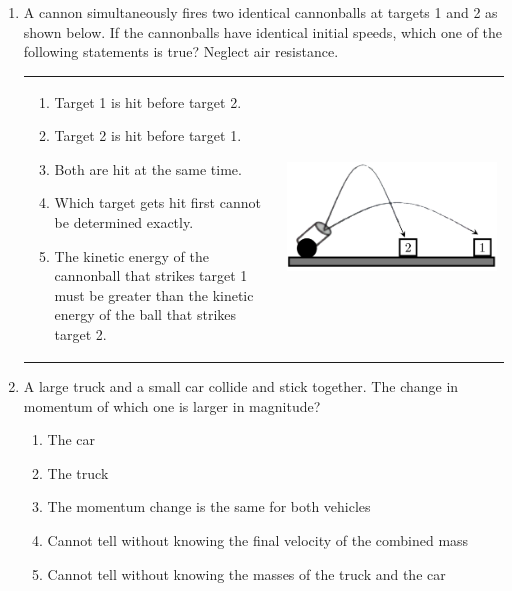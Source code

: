 \documentclass[12pt,letterpaper]{article}
\begin{document}
\begin{enumerate}

\item
A cannon simultaneously fires two identical cannonballs at targets 1 and 2 as shown below. If the cannonballs have identical initial speeds, which one of the following statements is true? Neglect air resistance.

\begin{tabular}{l r}

\begin{minipage}{0.5\textwidth}
\begin{enumerate}
\item Target 1 is hit before target 2.
\item Target 2 is hit before target 1.
\item Both are hit at the same time.
\item Which target gets hit first cannot be determined exactly.
\item The kinetic energy of the cannonball that strikes target 1 must be greater than the kinetic energy of the ball that strikes target 2.
\end{enumerate}
\end{minipage} &
\begin{minipage}{0.4\textwidth}
\includegraphics[width=\textwidth]{cannon.png}
\end{minipage}
\end{tabular}

\item
A large truck and a small car collide and stick together. The change in momentum of which one is larger in magnitude?
\begin{enumerate}
\item The car
\item The truck
\item The momentum change is the same for both vehicles
\item Cannot tell without knowing the final velocity of the combined mass
\item Cannot tell without knowing the masses of the truck and the car
\end{enumerate}


\end{enumerate}
\end{document}

